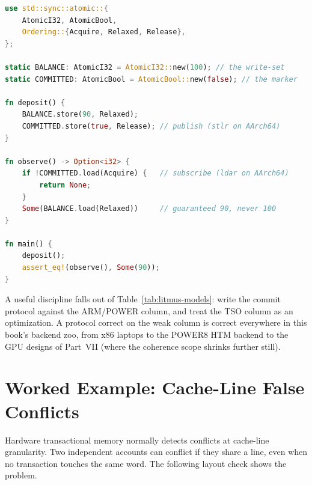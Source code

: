 \begin{lstlisting}[language=Rust, caption={The same message-passing
protocol in Rust: release publishes the commit, acquire observes it.},
label={lst:mp-rust}]
use std::sync::atomic::{
    AtomicI32, AtomicBool,
    Ordering::{Acquire, Relaxed, Release},
};

static BALANCE: AtomicI32 = AtomicI32::new(100); // the write-set
static COMMITTED: AtomicBool = AtomicBool::new(false); // the marker

fn deposit() {
    BALANCE.store(90, Relaxed);
    COMMITTED.store(true, Release); // publish (stlr on AArch64)
}

fn observe() -> Option<i32> {
    if !COMMITTED.load(Acquire) {   // subscribe (ldar on AArch64)
        return None;
    }
    Some(BALANCE.load(Relaxed))     // guaranteed 90, never 100
}

fn main() {
    deposit();
    assert_eq!(observe(), Some(90));
}
\end{lstlisting}

A useful discipline falls out of Table~\ref{tab:litmus-models}: write the
commit protocol against the ARM/POWER column, and treat the TSO column as
an optimization. A protocol correct on the weak column is correct
everywhere in this book's backend zoo, from x86 laptops to the POWER8
HTM backend to the GPU designs of Part~VII (where the coherence scope
shrinks further still).

\section{Worked Example: Cache-Line False Conflicts}

Hardware transactional memory normally detects conflicts at cache-line
granularity. Two independent accounts can conflict if they share a line, even
when no transaction touches the same word. The following layout check shows
the problem.

